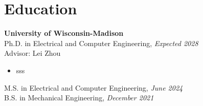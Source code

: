 \section{\sc Education}

 {\bf University of Wisconsin-Madison}\\
Ph.D. in Electrical and Computer Engineering, \textit{Expected 2028} \\
Advisor: Lei Zhou
\begin{itemize}
    \item sss
\end{itemize}
M.S. in Electrical and Computer Engineering, \textit{June 2024} \\
B.S. in Mechanical Engineering, \textit{December 2021}
\endinput